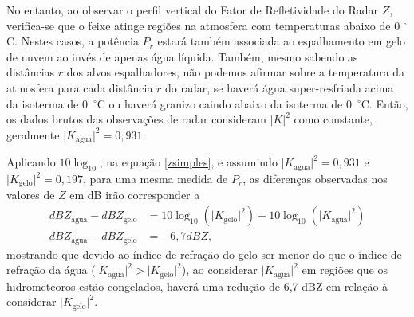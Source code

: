 
No entanto, ao observar o perfil vertical do Fator de Refletividade do Radar $Z$, verifica-se que o feixe atinge regiões na atmosfera com temperaturas abaixo de 0 $^{\circ}$C. Nestes casos, a potência $P_r$ estará também associada ao espalhamento em gelo de nuvem ao invés de apenas água líquida. Também, mesmo sabendo as distâncias $r$ dos alvos espalhadores, não podemos afirmar sobre a temperatura da atmosfera para cada distância $r$ do radar, se haverá água super-resfriada acima da isoterma de 0~$^{\circ}$C ou haverá granizo caindo abaixo da isoterma de 0~$^{\circ}$C. Então, os dados brutos das observações de radar consideram $|K|^2$ como constante, geralmente $\vert K_{\mathrm{agua}}\vert^2 = 0,931$.


Aplicando $10\log_{10}$, na equação \ref{zsimples}, e assumindo  $\vert K_{\mathrm{agua}}\vert^2 = 0,931$ e $\vert K_{\mathrm{gelo}}\vert^2= 0,197$, para uma mesma medida de $P_r$, as diferenças observadas nos valores de $Z$ em dB irão corresponder a
\begin{align}
dBZ_{\mathrm{agua}}-dBZ_{\mathrm{gelo}} &=  10\log_{10}(\vert K_{\mathrm{gelo}}\vert^2 ) - 10\log_{10}(\vert K_{\mathrm{agua}}\vert^2)\\
dBZ_{\mathrm{agua}}- dBZ_{\mathrm{gelo}} &= -6,7 dBZ,
\end{align}
mostrando que devido ao índice de refração do gelo ser menor do que o índice de refração da água ($\vert K_{\mathrm{agua}}\vert^2 > \vert K_{\mathrm{gelo}}\vert^2$), ao considerar $\vert K_{\mathrm{agua}}\vert^2$ em regiões que os hidrometeoros estão congelados, haverá uma redução de 6,7 dBZ em relação à considerar $\vert K_{\mathrm{gelo}}\vert^2$.  


